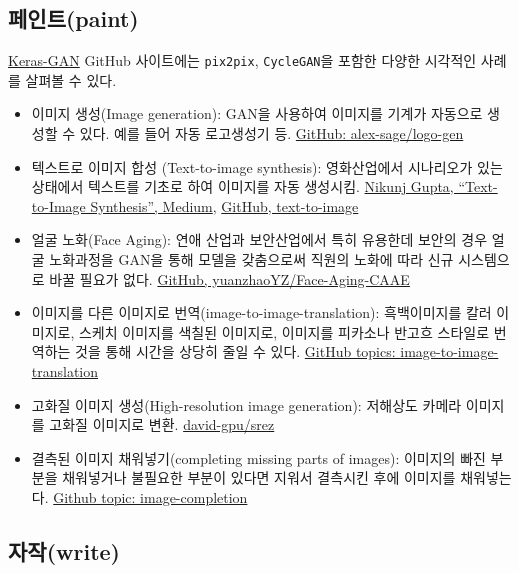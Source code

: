 \documentclass[smallextended]{svjour3}       %
\providecommand{\tightlist}{%
  \setlength{\itemsep}{0pt}\setlength{\parskip}{0pt}}
\begin{document}
\hypertarget{challenge-to-human-paint}{%
\subsection{페인트(paint)}\label{challenge-to-human-paint}}

\href{https://github.com/eriklindernoren/Keras-GAN}{Keras-GAN} GitHub
사이트에는 \texttt{pix2pix}, \texttt{CycleGAN}을 포함한 다양한 시각적인
사례를 살펴볼 수 있다.

\begin{itemize}
\tightlist
\item
  이미지 생성(Image generation): GAN을 사용하여 이미지를 기계가 자동으로
  생성할 수 있다. 예를 들어 자동 로고생성기 등.
  \href{https://github.com/alex-sage/logo-gen}{GitHub:
  alex-sage/logo-gen}
\item
  텍스트로 이미지 합성 (Text-to-image synthesis): 영화산업에서
  시나리오가 있는 상태에서 텍스트를 기초로 하여 이미지를 자동 생성시킴.
  \href{https://medium.com/datadriveninvestor/text-to-image-synthesis-6e5de1bf86ec}{Nikunj
  Gupta, ``Text-to-Image Synthesis'', Medium},
  \href{https://github.com/crisbodnar/text-to-image}{GitHub,
  text-to-image}
\item
  얼굴 노화(Face Aging): 연애 산업과 보안산업에서 특히 유용한데 보안의
  경우 얼굴 노화과정을 GAN을 통해 모델을 갖춤으로써 직원의 노화에 따라
  신규 시스템으로 바꿀 필요가 없다.
  \href{https://github.com/yuanzhaoYZ/Face-Aging-CAAE}{GitHub,
  yuanzhaoYZ/Face-Aging-CAAE}
\item
  이미지를 다른 이미지로 번역(image-to-image-translation): 흑백이미지를
  칼러 이미지로, 스케치 이미지를 색칠된 이미지로, 이미지를 피카소나
  반고흐 스타일로 번역하는 것을 통해 시간을 상당히 줄일 수 있다.
  \href{https://github.com/topics/image-to-image-translation}{GitHub
  topics: image-to-image-translation}
\item
  고화질 이미지 생성(High-resolution image generation): 저해상도 카메라
  이미지를 고화질 이미지로 변환.
  \href{https://github.com/david-gpu/srez}{david-gpu/srez}
\item
  결측된 이미지 채워넣기(completing missing parts of images): 이미지의
  빠진 부분을 채워넣거나 불필요한 부분이 있다면 지워서 결측시킨 후에
  이미지를 채워넣는다.
  \href{https://github.com/topics/image-completion}{Github topic:
  image-completion}
\end{itemize}

\hypertarget{writing-machine}{%
\subsection{자작(write)}\label{writing-machine}}
\end{document}
